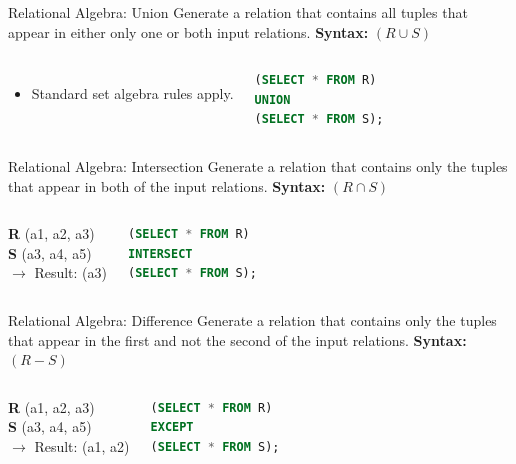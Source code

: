\documentclass[aspectratio=169, 10pt]{beamer}
\begin{document}
\begin{frame}[fragile]{Relational Algebra: Union}
    Generate a relation that contains all tuples that appear in either only one or both input relations.
    \vspace{1em}
    \textbf{Syntax:} $(R \cup S)$
    \vspace{1em}
    \begin{columns}
        \begin{itemize}
            \item Standard set algebra rules apply.
        \end{itemize}
        \begin{lstlisting}[language=SQL]
(SELECT * FROM R)
UNION
(SELECT * FROM S);
        \end{lstlisting}
    \end{columns}
\end{frame}

\begin{frame}[fragile]{Relational Algebra: Intersection}
    Generate a relation that contains only the tuples that appear in both of the input relations.
    \vspace{1em}
    \textbf{Syntax:} $(R \cap S)$
    \vspace{1em}
    \begin{columns}
        \textbf{R} (a1, a2, a3) \\ \textbf{S} (a3, a4, a5) \\
        $\rightarrow$ Result: (a3)
        \begin{lstlisting}[language=SQL]
(SELECT * FROM R)
INTERSECT
(SELECT * FROM S);
        \end{lstlisting}
    \end{columns}
\end{frame}

\begin{frame}[fragile]{Relational Algebra: Difference}
    Generate a relation that contains only the tuples that appear in the first and not the second of the input relations.
    \vspace{1em}
    \textbf{Syntax:} $(R - S)$
    \vspace{1em}
    \begin{columns}
        \textbf{R} (a1, a2, a3) \\ \textbf{S} (a3, a4, a5) \\
        $\rightarrow$ Result: (a1, a2)
        \begin{lstlisting}[language=SQL]
(SELECT * FROM R)
EXCEPT
(SELECT * FROM S);
        \end{lstlisting}
    \end{columns}
\end{frame}
\end{document}
